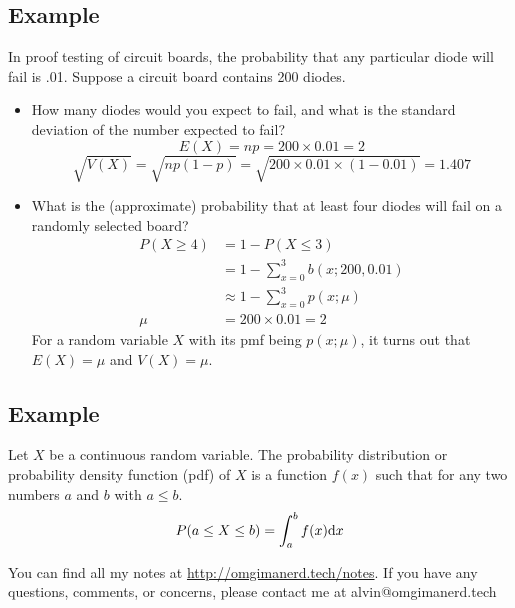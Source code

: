 \documentclass{math}
\begin{document}
\subsection*{Example}
In proof testing of circuit boards, the probability that any particular diode
will fail is .01. Suppose a circuit board contains 200 diodes.
\begin{itemize}
  \item How many diodes would you expect to fail, and what is the standard
    deviation of the number expected to fail?
    \[ E(X) = np = 200\times0.01 = 2 \]
    \[ \sqrt{V(X)} = \sqrt{np(1-p)} = \sqrt{200\times0.01\times(1-0.01)} =
       1.407 \]
  \item What is the (approximate) probability that at least four diodes will
    fail on a randomly selected board?
    \begin{align*}
      P(X\geq 4) &= 1-P(X\leq 3) \\
      &= 1-\sum_{x=0}^{3}b(x;200,0.01) \\
      &\approx 1-\sum_{x=0}^{3}p(x;\mu) \\
      \mu &= 200\times0.01 = 2
    \end{align*}
    For a random variable \( X \) with its pmf being \( p(x;\mu) \), it turns
    out that \( E(X) = \mu \) and \( V(X) = \mu \).
\end{itemize}

\subsection*{Example}
Let \( X \) be a continuous random variable. The probability distribution or
probability density function (pdf) of \( X \) is a function \( f(x) \) such that
for any two numbers \( a \) and \( b \) with \( a \leq b \).
\[ P(a\leq X\leq b) = \int_{a}^{b}f(x)\mathrm{d}{x} \]

\begin{center}
  You can find all my notes at \url{http://omgimanerd.tech/notes}. If you have
  any questions, comments, or concerns, please contact me at
  alvin@omgimanerd.tech
\end{center}
\end{document}
